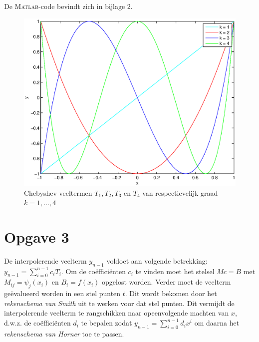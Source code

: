 \documentclass[a4paper]{article}
\newcommand{\opgave}[1]{\section*{Opgave #1}}
\begin{document}
De \textsc{Matlab}-code bevindt zich in bijlage 2.
\begin{figure}
        \centering
        \includegraphics[width=\textwidth]{Jona/chebyshev_polynomials.eps}
        \caption{Chebyshev veeltermen $T_{1},T_{2},T_{3}$ en $T_{4}$ van respectievelijk graad $k=1,\dots,4$}
        \label{fig:polynomials}
    \end{figure}
\opgave{3}
De interpolerende veelterm $y_{n-1}$ voldoet aan volgende betrekking: $y_{n-1} = \sum\limits_{i=0}^{n-1}c_{i}T_{i}$. Om de co\"effici\"enten $c_{i}$ te vinden moet het stelsel $Mc = B$ met $M_{ij} = \psi_{j}(x_{i})$ en $B_{i} = f(x_{i})$ opgelost worden. Verder moet de veelterm ge\"evalueerd worden in een stel punten $t$. Dit wordt bekomen door het \textit{rekenschema van Smith} uit te werken voor dat stel punten. Dit vermijdt de interpolerende veelterm te rangschikken naar opeenvolgende machten van $x$, d.w.z. de co\"effici\"enten $d_{i}$ te bepalen zodat $y_{n-1} = \sum\limits_{i=0}^{n-1}d_{i}x^{i}$ om daarna het \textit{rekenschema van Horner} toe te passen.
\end{document}
